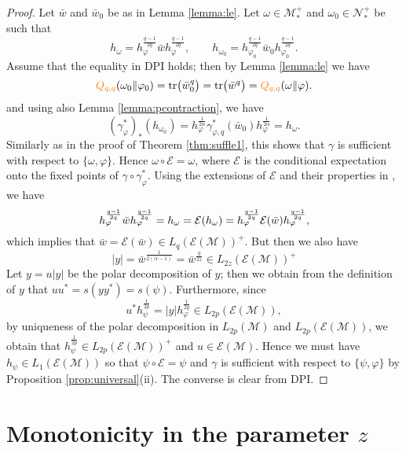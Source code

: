 \documentclass[12pt]{article}
\theoremstyle{definition}
\theoremstyle{remark}
\numberwithin{equation}{section}
\def\cE{\mathcal E}
\def\Me{\mathcal M}
\def\Ne{\mathcal N}
\def\Tr{\mathrm{tr}}
\def\ffi{\varphi}
\begin{document}
\begin{proof} Let $\bar w$ and $\bar w_0$ be as in Lemma \ref{lemma:le}. Let $\omega\in
\Me_*^+$ and $\omega_0\in \Ne_*^+$ be such that
{\[
h_\omega=h_\ffi^{\frac{q-1}{2q}}\bar wh_\ffi^{\frac{q-1}{2q}},\qquad
h_{\omega_0}=h_{\ffi_0}^{\frac{q-1}{2q}}\bar w_0h_{\ffi_0}^{\frac{q-1}{2q}}.
\]}
 Assume that the equality in DPI holds; then by Lemma
\ref{lemma:le} we have
\[
\textcolor{orange}{Q_{q,q}}(\omega_0\|\varphi_0)=\Tr\bigl(\bar w_0^q\bigr)=\Tr\bigl(\bar
w^q\bigr)=
\textcolor{orange}{Q_{q,q}}(\omega\|\varphi).
\]
and using also Lemma \ref{lemma:pcontraction}, we have
\[
(\gamma^*_\ffi)_*(h_{\omega_0})=h_\ffi^{\frac1{2\alpha}}\gamma^*_{\ffi,q}(\bar
w_0)h_\ffi^{\frac1{2\alpha}}=h_\omega.
\]
Similarly as in the proof of {Theorem \ref{thm:suffle1},} this shows that $\gamma$ is sufficient
with respect to $\{\omega,\ffi\}$. Hence $\omega\circ \cE=\omega$, where $\cE$ is the
conditional expectation onto the fixed points of $\gamma\circ\gamma^*_\ffi$.  Using the
extensions of $\cE$ and their properties {in \cite{junge2003noncommutative}, we have}
\[
h_\varphi^{q-1\over2q}\bar
wh_\varphi^{q-1\over 2q}=h_\omega=\cE(h_\omega)=h_\varphi^{q-1\over 2q}\cE(\bar
w)h_\varphi^{q-1\over 2q},
\]
which implies that $\bar w=\cE(\bar w)\in L_q(\cE(\Me))^+$. But then we also have
\[
|y|=\bar w^{\frac1{2(\alpha-1)}}=\bar w^{\frac{q}{2z}}\in L_{2z}(\cE(\Me))^+
\]
Let $y=u|y|$ be the polar decomposition of $y$; then we obtain from the definition of $y$ that
$uu^*=s(yy^*)=s(\psi)$. Furthermore, since
\[
u^*h_\psi^{\frac1{2p}}=|y|h_\varphi^{\frac1{2q}}\in L_{2p}(\cE(\Me)),
\]
by uniqueness of the polar decomposition in $L_{2p}(\Me)$ and $L_{2p}(\cE(\Me))$, we
obtain that $h_{\psi}^{\frac1{2p}}\in L_{2p}(\cE(\Me))^+$ and $u\in \cE(\Me)$. Hence we must
have $h_\psi\in L_1(\cE(\Me))$ so that $\psi\circ\cE=\psi$ and $\gamma$ is sufficient with
respect to $\{\psi,\ffi\}$ by Proposition \ref{prop:universal}(ii). The converse is clear from DPI.
\end{proof}


\section{Monotonicity in the parameter $z$}
\end{document}
